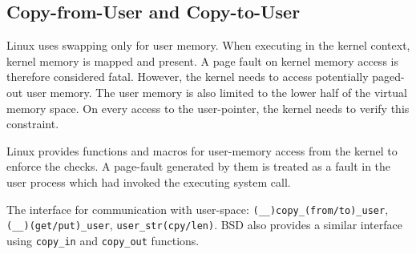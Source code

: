 


\subsection{Copy-from-User and Copy-to-User}
\label{subsec:copy}


Linux uses swapping only for user memory. When executing in the kernel context,
kernel memory is mapped and present. A page fault on kernel memory access is
therefore considered fatal. However, the kernel needs to access potentially
paged-out user memory. The user memory is also limited to the lower half of the
virtual memory space. On every access to the user-pointer, the kernel needs to
verify this constraint.

Linux provides functions and macros for user-memory access from the kernel to 
enforce the checks. A page-fault generated by them is treated as a fault in the
user process which had invoked the executing system call.


The interface for communication with user-space: \texttt{(\_\_)copy\_(from/to)\_user},
\texttt{(\_\_)(get/put)\_user}, \texttt{user\_str(cpy/len)}.
BSD also provides a similar interface using \texttt{copy\_in} and 
\texttt{copy\_out} functions.

